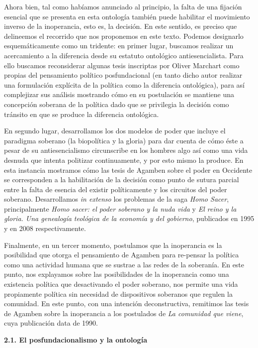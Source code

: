 Ahora bien, tal como habíamos anunciado al principio, la falta de una fijación esencial que se presenta en esta ontología también puede habilitar el movimiento inverso de la inoperancia, esto es, la decisión. En este sentido, es preciso que delineemos el recorrido que nos proponemos en este texto. Podemos designarlo esquemáticamente como un tridente: en primer lugar, buscamos realizar un acercamiento a la diferencia desde su estatuto ontológico antiesencialista. Para ello buscamos reconsiderar algunas tesis inscriptas por Oliver Marchart como propias del pensamiento político posfundacional (en tanto dicho autor realizar una formulación explícita de la política como la diferencia ontológica), para así complejizar sus análisis mostrando cómo en su postulación se mantiene una concepción soberana de la política dado que se privilegia la decisión como tránsito en que se produce la diferencia ontológica.

En segundo lugar, desarrollamos los dos modelos de poder que incluye el paradigma soberano (la biopolítica y la gloria) para dar cuenta de cómo éste a pesar de su antiesencialismo circunscribe en los hombres algo así como una vida desnuda que intenta politizar continuamente, y por esto mismo la produce. En esta instancia mostramos cómo las tesis de Agamben sobre el poder en Occidente se corresponden a la habilitación de la decisión como punto de sutura parcial entre la falta de esencia del existir políticamente y los circuitos del poder soberano. Desarrollamos \emph{in extenso }los problemas de la saga \emph{Homo Sacer}, principalmente \emph{Homo sacer: el poder soberano y la nuda vida} y \emph{El reino y la gloria. Una genealogía teológica de la economía y del gobierno}, publicados en 1995 y en 2008 respectivamente.

Finalmente, en un tercer momento, postulamos que la inoperancia es la posibilidad que otorga el pensamiento de Agamben para re-pensar la política como una actividad humana que se sustrae a las redes de la soberanía. En este punto, nos explayamos sobre las posibilidades de la inoperancia como una existencia política que desactivando el poder soberano, nos permite una vida propiamente política sin necesidad de dispositivos soberanos que regulen la comunidad. En este punto, con una intención deconstructiva, remitimos las tesis de Agamben sobre la inoperancia a los postulados de \emph{La comunidad que viene}, cuya publicación data de 1990.

\textbf{2.1. El posfundacionalismo y la ontología}


